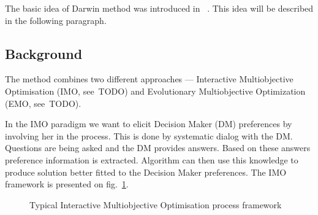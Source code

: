 The basic idea of Darwin method was introduced in~ \cite{GMS09}. This idea will
be described in the following paragraph.

\subsection{Background}

The method combines two different approaches --- Interactive Multiobjective
Optimisation (IMO, see~TODO) and Evolutionary Multiobjective Optimization
(EMO, see~TODO).

In the IMO paradigm we want to elicit Decision Maker (DM) preferences by
involving her in the process. This is done by systematic dialog with the
DM. Questions are being asked and the DM provides answers. Based on these
answers preference information is extracted. Algorithm can then use this
knowledge to produce solution better fitted to the Decision Maker
preferences. The IMO framework is presented on
fig.~\ref{fig:interactive-process}.

\begin{figure} 
  \begin{center}
    \caption{Typical Interactive Multiobjective
      Optimisation process framework\label{fig:interactive-process}}
  \end{center} 
\end{figure} 

